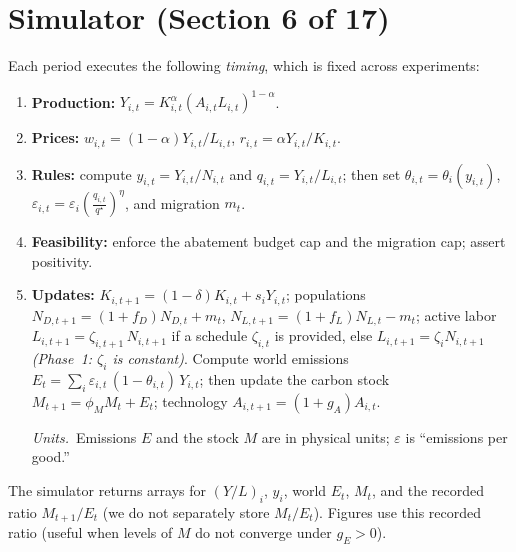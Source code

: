 \documentclass[12pt,a4paper]{article}
\begin{document}
\section{Simulator (Section 6 of 17)}
Each period executes the following \emph{timing}, which is fixed across experiments:
\begin{enumerate}[leftmargin=1.5em]
  \item \textbf{Production:} \(Y_{i,t}=K_{i,t}^{\alpha}(A_{i,t} L_{i,t})^{1-\alpha}\).
  \item \textbf{Prices:} \(w_{i,t}=(1-\alpha)Y_{i,t}/L_{i,t}\), \(r_{i,t}=\alpha Y_{i,t}/K_{i,t}\).
  \item \textbf{Rules:} compute \(y_{i,t}=Y_{i,t}/N_{i,t}\) and \(q_{i,t}=Y_{i,t}/L_{i,t}\); then set
\(\theta_{i,t}=\theta_i(y_{i,t})\), \(\varepsilon_{i,t}=\varepsilon_i\!\left(\frac{q_{i,t}}{q^\star}\right)^{\eta}\), and migration \(m_t\).
  \item \textbf{Feasibility:} enforce the abatement budget cap and the migration cap; assert positivity.
  \item \textbf{Updates:} \(K_{i,t+1}=(1-\delta)K_{i,t}+s_iY_{i,t}\); populations
  \(N_{D,t+1}=(1+f_D)N_{D,t}+m_t\), \(N_{L,t+1}=(1+f_L)N_{L,t}-m_t\); active labor 
  \(L_{i,t+1}=\zeta_{i,t+1}\,N_{i,t+1}\) if a schedule \(\zeta_{i,t}\) is provided, else \(L_{i,t+1}=\zeta_i N_{i,t+1}\) \textit{(Phase~1: \(\zeta_i\) is constant)}. 
  Compute world emissions \(E_t=\sum_i \varepsilon_{i,t}\,(1-\theta_{i,t})\,Y_{i,t}\); then update the carbon stock \(M_{t+1}=\phi_M M_t+E_t\); technology \(A_{i,t+1}=(1+g_A)A_{i,t}\).\par\noindent\textit{Units.}\ Emissions \(E\) and the stock \(M\) are in physical units; \(\varepsilon\) is “emissions per good.”
\end{enumerate}
The simulator returns arrays for \((Y/L)_i\), \(y_i\), world \(E_t\), \(M_t\), and the recorded ratio \(M_{t+1}/E_t\) (we do not separately store \(M_t/E_t\)). Figures use this recorded ratio (useful when levels of \(M\) do not converge under \(g_E>0\)).\\



\end{document}
